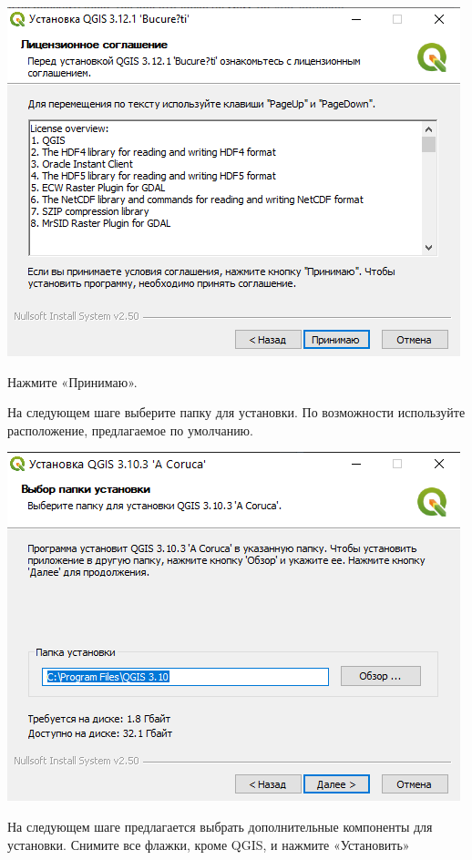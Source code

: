 \documentclass[
  12pt,
]{book}
\begin{document}
\includegraphics{images/installation_instruction_win/win02.png}

Нажмите «Принимаю».

На следующем шаге выберите папку для установки. По возможности используйте расположение, предлагаемое по умолчанию.

\includegraphics{images/installation_instruction_win/win03.png}

На следующем шаге предлагается выбрать дополнительные компоненты для установки. Снимите все флажки, кроме QGIS, и нажмите «Установить»
\end{document}
